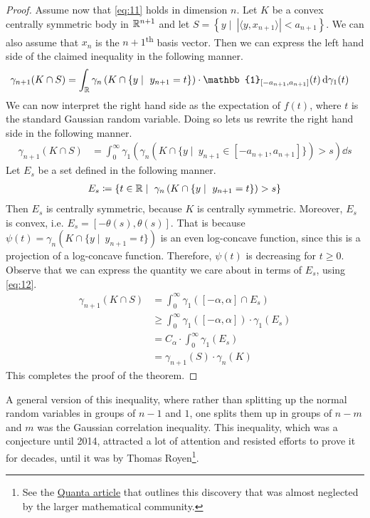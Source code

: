 \documentclass[11pt]{article}
\begin{document}
\begin{proof}
  Assume now that \eqref{eq:11} holds in dimension $n$.
  Let $K$ be a convex centrally symmetric body in $\mathbb{R}^{n+1}$ and let $S = \left\{ y \mid\ |\langle y, x_{n+1} \rangle| < a_{n+1} \right\}$.
  We can also assume that $x_n$ is the $n+1$\textsuperscript{th} basis vector.
  Then we can express the left hand side of the claimed inequality in the following manner.
  \begin{align*}
    \gamma_{n+1}(K \cap S)
    &= \int_{\R} \gamma_n\left( K \cap \left\{ y \mid\ y_{n+1} = t \right\} \right)\cdot \mathbb{1}_{[-a_{n+1}, a_{n+1}]}(t) \dd \gamma_1(t)
  \end{align*}
  We can now interpret the right hand side as the expectation of $f(t)$, where $t$ is the standard Gaussian random variable.
  Doing so lets us rewrite the right hand side in the following manner.
  \begin{align}
    \label{eq:12}
    \gamma_{n+1}(K \cap S)
    &= \int_{0}^{\infty} \gamma_1\left( \gamma_n\left( K \cap \{y \mid\ y_{n+1} \in [-a_{n+1}, a_{n+1}]\} \right) > s \right) \dd s
  \end{align}
  Let $E_s$ be a set defined in the following manner.
  \begin{align*}
    E_s \coloneqq \left\{ t \in \R \mid\ \gamma_n\left( K \cap \{y \mid\ y_{n+1} = t\} \right)  > s\right\}
  \end{align*}
  Then $E_s$ is centrally symmetric, because $K$ is centrally symmetric.
  Moreover, $E_s$ is convex, i.e. $E_s = [-\theta(s), \theta(s)]$.
  That is because $\psi(t) = \gamma_n(K \cap \{y \mid\ y_{n+1} = t\})$ is an even log-concave function, since this is a projection of a log-concave function.
  Therefore, $\psi(t)$ is decreasing for $t \geq 0$.
  Observe that we can express the quantity we care about in terms of $E_s$, using \eqref{eq:12}.
  \begin{align*}
    \gamma_{n+1}(K \cap S) &= \int_0^{\infty} \gamma_1\left( [-\alpha, \alpha] \cap E_s \right) \\
                           &\geq \int_0^{\infty} \gamma_1\left( [-\alpha, \alpha] \right) \cdot \gamma_1(E_s) \\
                           &= C_{\alpha} \cdot \int_0^{\infty} \gamma_1(E_s) \\
                           &= \gamma_{n+1}(S) \cdot \gamma_n(K)
  \end{align*}
  This completes the proof of the theorem.
\end{proof}
\begin{remark}
  A general version of this inequality, where rather than splitting up the normal random variables in groups of $n-1$ and $1$, one splits them up in groups of $n-m$ and $m$ was the Gaussian correlation inequality.
  This inequality, which was a conjecture until 2014, attracted a lot of attention and resisted efforts to prove it for decades, until it was by Thomas Royen\footnote{See the \href{https://www.quantamagazine.org/statistician-proves-gaussian-correlation-inequality-20170328/}{Quanta article} that outlines this discovery that was almost neglected by the larger mathematical community.}.
\end{remark}
\end{document}
